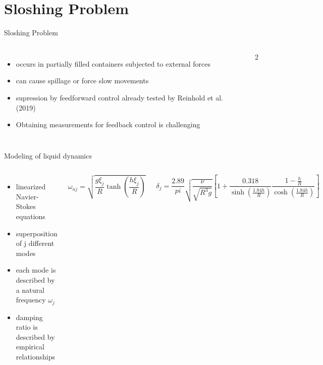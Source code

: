 \documentclass[de]{sdqbeamer}
\begin{document}

\section{Sloshing Problem }
\begin{frame}{Sloshing Problem}
    \begin{columns}
        \begin{itemize}
            \item occurs in partially filled containers subjected to external forces
            \item can cause spillage or force slow movements
            \item supression by feedforward control already tested by Reinhold et al. (2019)
            \item Obtaining measurements for feedback control is challenging
        \end{itemize}        
        2
     
    \end{columns}   
\end{frame}


\begin{frame}{Modeling of liquid dynamics}
    \begin{columns}
        \begin{itemize}
            \item linearized Navier-Stokes equations  
            \item superposition of j different modes
            \item each mode is described by a natural frequency $\omega_j$ 
            \item damping ratio is described by empirical relationships

        \end{itemize}        

            \begin{equation} 
                \omega_{nj} = \sqrt{\frac{g \xi_j}{R} \tanh\left(\frac{h \xi_j}{R}\right)}
            \end{equation}

            \begin{equation}
                \delta_j = \frac{2.89}{pi}\sqrt{\frac{\nu}{\sqrt{R^3g}}}\left[1 + \frac{0.318}{\sinh\left(\frac{1.84h}{R}\right)}\frac{1-\frac{h}{R}}{\cosh\left(\frac{1.84h}{R}\right)}\right]
            \end{equation}
    \end{columns}   
\end{frame}
\end{document}
